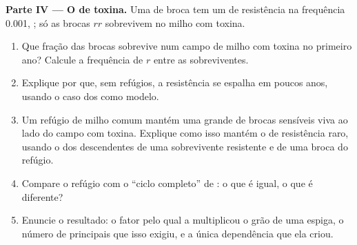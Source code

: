 \begin{problem}
\medskip
\noindent\textbf{Parte IV --- O  de toxina.}
Uma  de broca tem um  de resistência na frequência 0.001,
; só as brocas $rr$ sobrevivem no milho com toxina.
\begin{enumerate}[resume]
  \item Que fração das brocas sobrevive num campo de milho com toxina
        no primeiro ano? Calcule a frequência de $r$ entre as sobreviventes.
  \item Explique por que, sem refúgios, a resistência se espalha em
        poucos anos, usando o caso dos  como modelo.
  \item Um refúgio de milho comum mantém uma  grande de brocas
        sensíveis viva ao lado do campo com toxina. Explique como isso
        mantém o  de resistência raro, usando o  dos
        descendentes de uma sobrevivente resistente e de uma broca do refúgio.
  \item Compare o refúgio com o ``ciclo completo'' de : o
        que é igual, o que é diferente?
  \item Enuncie o resultado: o fator pelo qual a 
        multiplicou o grão de uma espiga, o número de  principais
        que isso exigiu, e a única dependência que ela criou.
\end{enumerate}
\end{problem}
